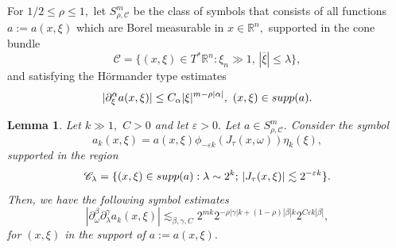 \documentclass[12pt, reqno]{amsart}
\newtheorem{lemma}[theorem]{Lemma}
\theoremstyle{definition}
\theoremstyle{remark}
\numberwithin{equation}{section}
\begin{document}
For $1/2\leq \rho\leq 1,$ let $S^{m}_{\rho,\mathscr{C}}$ be the class of symbols  that consists of all functions $a:=a(x,\xi)$ which are Borel measurable in $x\in \mathbb{R}^n,$ supported  in the cone bundle
\begin{equation}
    \mathscr{C}=\{(x,\xi)\in T^{*}\mathbb{R}^n:\xi_{n}\gg 1,\,|\overline{\xi}|\leq \lambda\},
\end{equation} and satisfying the H\"ormander type estimates 
\begin{equation}\label{rho:estimates}
    |\partial_\xi^\alpha a(x,\xi)|\leq C_\alpha|\xi|^{m-\rho|\alpha|},\,\,(x,\xi)\in \textnormal{supp}(a).
\end{equation}
\begin{lemma}\label{Lemma:Order:m}   Let $k\gg 1,$ $C>0$ and let $\varepsilon>0.$ Let $a\in S^{m}_{\rho,\mathscr{C}}.$ Consider the symbol 
\begin{equation}
    a_{k}(x,\xi)= a(x,\xi)\phi_{-\varepsilon k}(J_{\tau}(x,\omega))\eta_{k}(\xi),
\end{equation}  supported in the  region
$$\mathscr{C}_\lambda=\{(x,\xi)\in \textnormal{supp}(a): \lambda\sim 2^k; \,|J_{\tau}(x,\xi)|\lesssim 2^{-\varepsilon k}\}.$$ Then, we have the following symbol estimates
\begin{equation}\label{symbol:radial:angular:type:order:m}
    |\partial_\omega^\beta \partial_{\lambda}^\gamma a_{k}(x,\xi) |\lesssim_{\beta,\gamma,C} 2^{mk}2^{-\rho|\gamma|k+(1-\rho)|\beta|k} 2^{C\varepsilon k |\beta|},
\end{equation} for $(x,\xi)$ in the support of $a:=a(x,\xi).$
\end{lemma}
\end{document}
